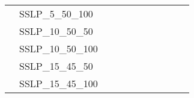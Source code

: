 \begin{table}[]
{\begin{tabular}{|c|l|ll|ll|ll|l|l|l|}
			& SSLP\_5\_50\_100              &                                   &                                  &                           &                          &                           &                          &                                       &                               & \\
			& SSLP\_10\_50\_50              &                                   &                                  &                           &                          &                           &                          &                                       &                               & \\
			& SSLP\_10\_50\_100             &                                   &                                  &                           &                          &                           &                          &                                       &                               & \\
			& SSLP\_15\_45\_50              &                                   &                                  &                           &                          &                           &                          &                                       &                               & \\
			& SSLP\_15\_45\_100             &                                   &                                  &                           &                          &                           &                          &                                       &                               & \\

\end{tabular}}
\end{table}
